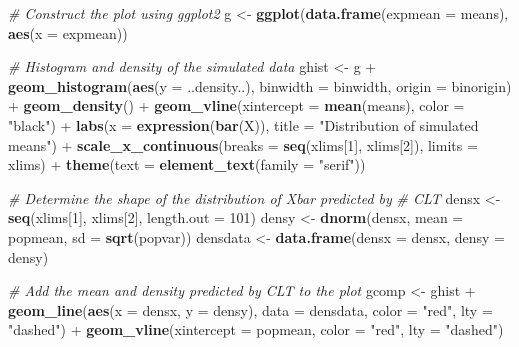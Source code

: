 \documentclass[12pt,a4paper]{article}
\newenvironment{Shaded}{\begin{snugshade}}{\end{snugshade}}
\newcommand{\KeywordTok}[1]{\textcolor[rgb]{0.13,0.29,0.53}{\textbf{{#1}}}}
\newcommand{\DataTypeTok}[1]{\textcolor[rgb]{0.13,0.29,0.53}{{#1}}}
\newcommand{\DecValTok}[1]{\textcolor[rgb]{0.00,0.00,0.81}{{#1}}}
\newcommand{\StringTok}[1]{\textcolor[rgb]{0.31,0.60,0.02}{{#1}}}
\newcommand{\CommentTok}[1]{\textcolor[rgb]{0.56,0.35,0.01}{\textit{{#1}}}}
\newcommand{\NormalTok}[1]{{#1}}
\begin{document}
\begin{Shaded}
\begin{Highlighting}[]
    \CommentTok{# Construct the plot using ggplot2}
    \NormalTok{g <-}\StringTok{ }\KeywordTok{ggplot}\NormalTok{(}\KeywordTok{data.frame}\NormalTok{(}\DataTypeTok{expmean =} \NormalTok{means), }\KeywordTok{aes}\NormalTok{(}\DataTypeTok{x =} \NormalTok{expmean))}
    
    \CommentTok{# Histogram and density of the simulated data}
    \NormalTok{ghist <-}\StringTok{ }\NormalTok{g +}\StringTok{ }\KeywordTok{geom_histogram}\NormalTok{(}\KeywordTok{aes}\NormalTok{(}\DataTypeTok{y =} \NormalTok{..density..),}
                                \DataTypeTok{binwidth =} \NormalTok{binwidth, }\DataTypeTok{origin =} \NormalTok{binorigin) +}
\StringTok{        }\KeywordTok{geom_density}\NormalTok{() +}
\StringTok{        }\KeywordTok{geom_vline}\NormalTok{(}\DataTypeTok{xintercept =} \KeywordTok{mean}\NormalTok{(means), }\DataTypeTok{color =} \StringTok{"black"}\NormalTok{) +}
\StringTok{        }\KeywordTok{labs}\NormalTok{(}\DataTypeTok{x =} \KeywordTok{expression}\NormalTok{(}\KeywordTok{bar}\NormalTok{(X)),}
             \DataTypeTok{title =} \StringTok{"Distribution of simulated means"}\NormalTok{) +}
\StringTok{        }\KeywordTok{scale_x_continuous}\NormalTok{(}\DataTypeTok{breaks =} \KeywordTok{seq}\NormalTok{(xlims[}\DecValTok{1}\NormalTok{], xlims[}\DecValTok{2}\NormalTok{]),}
                           \DataTypeTok{limits =} \NormalTok{xlims) +}
\StringTok{        }\KeywordTok{theme}\NormalTok{(}\DataTypeTok{text =} \KeywordTok{element_text}\NormalTok{(}\DataTypeTok{family =} \StringTok{"serif"}\NormalTok{))}
    
    \CommentTok{# Determine the shape of the distribution of Xbar predicted by}
    \CommentTok{# CLT}
    \NormalTok{densx <-}\StringTok{ }\KeywordTok{seq}\NormalTok{(xlims[}\DecValTok{1}\NormalTok{], xlims[}\DecValTok{2}\NormalTok{], }\DataTypeTok{length.out =} \DecValTok{101}\NormalTok{)}
    \NormalTok{densy <-}\StringTok{ }\KeywordTok{dnorm}\NormalTok{(densx, }\DataTypeTok{mean =} \NormalTok{popmean, }\DataTypeTok{sd =} \KeywordTok{sqrt}\NormalTok{(popvar))}
    \NormalTok{densdata <-}\StringTok{ }\KeywordTok{data.frame}\NormalTok{(}\DataTypeTok{densx =} \NormalTok{densx, }\DataTypeTok{densy =} \NormalTok{densy)}
    
    \CommentTok{# Add the mean and density predicted by CLT to the plot}
    \NormalTok{gcomp <-}\StringTok{ }\NormalTok{ghist +}\StringTok{ }\KeywordTok{geom_line}\NormalTok{(}\KeywordTok{aes}\NormalTok{(}\DataTypeTok{x =} \NormalTok{densx, }\DataTypeTok{y =} \NormalTok{densy), }\DataTypeTok{data =} \NormalTok{densdata,}
                               \DataTypeTok{color =} \StringTok{"red"}\NormalTok{, }\DataTypeTok{lty =} \StringTok{"dashed"}\NormalTok{) +}
\StringTok{        }\KeywordTok{geom_vline}\NormalTok{(}\DataTypeTok{xintercept =} \NormalTok{popmean, }\DataTypeTok{color =} \StringTok{"red"}\NormalTok{, }\DataTypeTok{lty =} \StringTok{"dashed"}\NormalTok{)}
    

\end{Highlighting}
\end{Shaded}
\end{document}
